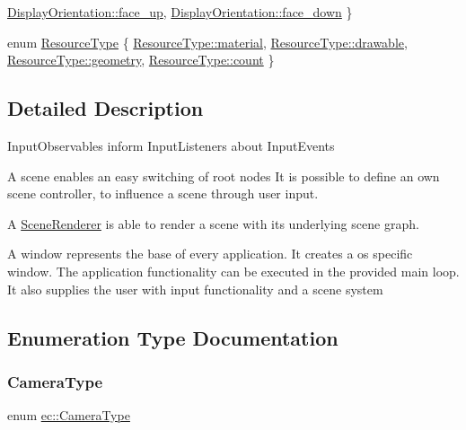 \begin{DoxyCompactItemize}
\newline
\mbox{\hyperlink{namespaceec_a1492d2e603a780e281848af6a4bad719a44eab28cf52a20d532ede6171589aab4}{Display\+Orientation\+::face\+\_\+up}}, 
\mbox{\hyperlink{namespaceec_a1492d2e603a780e281848af6a4bad719ab6e43090c35d607589e26c65aa3423a0}{Display\+Orientation\+::face\+\_\+down}}
 \}
\item 
enum \mbox{\hyperlink{namespaceec_ae4420ccd0f79418a5ce075e43909289f}{Resource\+Type}} \{ \mbox{\hyperlink{namespaceec_ae4420ccd0f79418a5ce075e43909289faeec34d804c9ce6c89cff596be555e6a4}{Resource\+Type\+::material}}, 
\mbox{\hyperlink{namespaceec_ae4420ccd0f79418a5ce075e43909289fac571a3227368b17e0ecc38a2a417e201}{Resource\+Type\+::drawable}}, 
\mbox{\hyperlink{namespaceec_ae4420ccd0f79418a5ce075e43909289faed7daeb157cd9b31e53896ad3c771a26}{Resource\+Type\+::geometry}}, 
\mbox{\hyperlink{namespaceec_ae4420ccd0f79418a5ce075e43909289fae2942a04780e223b215eb8b663cf5353}{Resource\+Type\+::count}}
 \}
\end{DoxyCompactItemize}


\subsection{Detailed Description}
Input\+Observables inform Input\+Listeners about Input\+Events

A scene enables an easy switching of root nodes It is possible to define an own scene controller, to influence a scene through user input.

A \mbox{\hyperlink{classec_1_1_scene_renderer}{Scene\+Renderer}} is able to render a scene with its underlying scene graph.

A window represents the base of every application. It creates a os specific window. The application functionality can be executed in the provided main loop. It also supplies the user with input functionality and a scene system 

\subsection{Enumeration Type Documentation}
\mbox{\label{namespaceec_aeb1f95f6e5d6c17c5a67f68e44746ac4}} 
\subsubsection{\texorpdfstring{Camera\+Type}{CameraType}}
{\footnotesize\ttfamily enum \mbox{\hyperlink{namespaceec_aeb1f95f6e5d6c17c5a67f68e44746ac4}{ec\+::\+Camera\+Type}}\hspace{0.3cm}{\ttfamily [strong]}}

